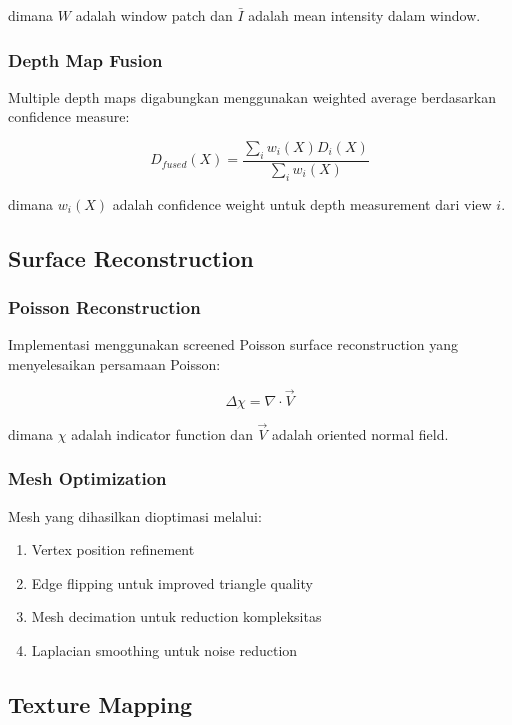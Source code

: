 \documentclass[12pt,a4paper]{article}
\begin{document}
dimana $W$ adalah window patch dan $\bar{I}$ adalah mean intensity dalam window.

\subsubsection{Depth Map Fusion}

Multiple depth maps digabungkan menggunakan weighted average berdasarkan confidence measure:

\begin{equation}
D_{fused}(X) = \frac{\sum_i w_i(X) D_i(X)}{\sum_i w_i(X)}
\end{equation}

dimana $w_i(X)$ adalah confidence weight untuk depth measurement dari view $i$.

\subsection{Surface Reconstruction}

\subsubsection{Poisson Reconstruction}

Implementasi menggunakan screened Poisson surface reconstruction yang menyelesaikan persamaan Poisson:

\begin{equation}
\Delta \chi = \nabla \cdot \vec{V}
\end{equation}

dimana $\chi$ adalah indicator function dan $\vec{V}$ adalah oriented normal field.

\subsubsection{Mesh Optimization}

Mesh yang dihasilkan dioptimasi melalui:
\begin{enumerate}
    \item Vertex position refinement
    \item Edge flipping untuk improved triangle quality
    \item Mesh decimation untuk reduction kompleksitas
    \item Laplacian smoothing untuk noise reduction
\end{enumerate}

\subsection{Texture Mapping}
\end{document}
